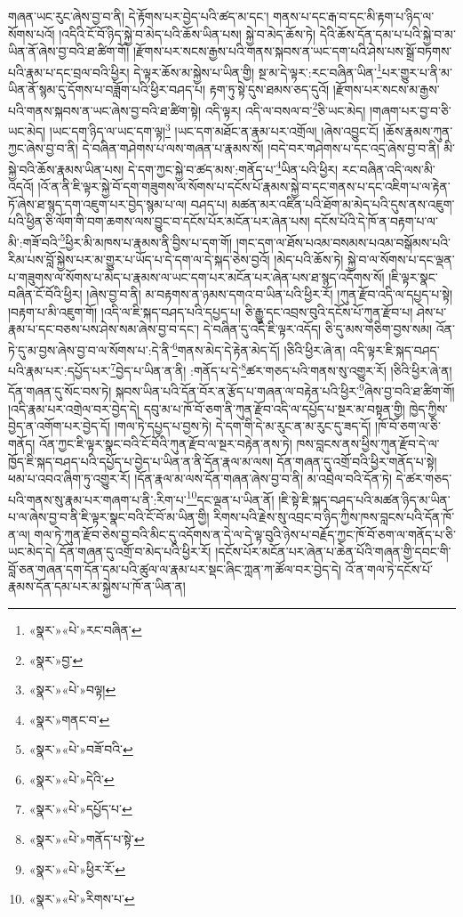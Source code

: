 གཞན་ཡང་རུང་ཞེས་བྱ་བ་ནི། དེ་རྟོགས་པར་བྱེད་པའི་ཚད་མ་དང་། གནས་པ་དང་རྒ་བ་དང་མི་རྟག་པ་ཉིད་ལ་སོགས་པའོ། །འདིའི་ངོ་བོ་ཉིད་སྐྱེ་བ་མེད་པའི་ཆོས་ཡིན་པས། སྐྱེ་བ་མེད་ཆོས་ཏེ། དེའི་ཆོས་དོན་དམ་པ་པའི་སྐྱེ་བ་མ་ཡིན་ནོ་ཞེས་བྱ་བའི་ཐ་ཚིག་གོ། །རྫོགས་པར་སངས་རྒྱས་པའི་གནས་སྐབས་ན་ཡང་དག་པའི་ཤེས་པས་སྒྲོ་བཏགས་པའི་རྣམ་པ་དང་བྲལ་བའི་ཕྱིར། དེ་ལྟར་ཆོས་མ་སྐྱེས་པ་ཡིན་གྱི། སྔ་མ་དེ་ལྟར་:རང་བཞིན་ཡིན་\footnote{«སྣར་»«པེ་»རང་བཞིན་}པར་གྱུར་པ་ནི་མ་ཡིན་ནོ་སྙམ་དུ་དོགས་པ་བཟློག་པའི་ཕྱིར་བཤད་པ། རྟག་ཏུ་སྟེ་དུས་ཐམས་ཅད་དུའོ། །རྫོགས་པར་སངས་མ་རྒྱས་པའི་གནས་སྐབས་ན་ཡང་ཞེས་བྱ་བའི་ཐ་ཚིག་སྟེ། འདི་ལྟར། འདི་ལ་བསལ་བ་\footnote{«སྣར་»བྱ་}ཅི་ཡང་མེད། །གཞག་པར་བྱ་བ་ཅི་ཡང་མེད། །ཡང་དག་ཉིད་ལ་ཡང་དག་ལྟ།\footnote{«སྣར་»«པེ་»བལྟ།} །ཡང་དག་མཐོང་ན་རྣམ་པར་འགྲོལ། །ཞེས་འབྱུང་ངོ། །ཆོས་རྣམས་ཀུན་ཀྱང་ཞེས་བྱ་བ་ནི། དེ་བཞིན་གཤེགས་པ་ལས་གཞན་པ་རྣམས་སོ། །བདེ་བར་གཤེགས་པ་དང་འདྲ་ཞེས་བྱ་བ་ནི། མི་སྐྱེ་བའི་ཆོས་རྣམས་ཡིན་པས། དེ་དག་ཀྱང་སྐྱེ་བ་ཚད་མས་:གནོད་པ་\footnote{«སྣར་»གནང་བ་}ཡིན་པའི་ཕྱིར། རང་བཞིན་འདི་ལས་མི་འདའོ། །འོ་ན་ནི་ཇི་ལྟར་སྐྱེ་བོ་དག་གཟུགས་ལ་སོགས་པ་དངོས་པོ་རྣམས་སྐྱེ་བ་དང་གནས་པ་དང་འཇིག་པ་ལ་རྟེན་ཏོ་ཞེས་ཐ་སྙད་དག་འཇུག་པར་བྱེད་སྙམ་པ་ལ། བཤད་པ། མཚན་མར་འཛིན་པའི་ཐོག་མ་མེད་པའི་དུས་ནས་འཇུག་པའི་ཕྱིན་ཅི་ལོག་གི་བག་ཆགས་ལས་བྱུང་བ་དངོས་པོར་མངོན་པར་ཞེན་པས། དངོས་པོའི་དེ་ཁོ་ན་བརྟག་པ་ལ་མི་:གཟོ་བའི་\footnote{«སྣར་»«པེ་»བཟོ་བའི་}ཕྱིར་མི་མཁས་པ་རྣམས་ནི་བྱིས་པ་དག་གོ། །གང་དག་ལ་ཐོས་པའམ་བསམས་པའམ་བསྒོམས་པའི་རིམ་པས་བློ་སྐྱེས་པར་མ་གྱུར་པ་ཡོད་པ་དེ་དག་ལ་དེ་སྐད་ཅེས་བྱའོ། །མེད་པའི་ཆོས་ཏེ། སྐྱེ་བ་ལ་སོགས་པ་དང་ལྡན་པ་གཟུགས་ལ་སོགས་པ་མེད་པ་རྣམས་ལ་ཡང་དག་པར་མངོན་པར་ཞེན་པས་ཐ་སྙད་འདོགས་སོ། །ཇི་ལྟར་སྣང་བཞིན་ངོ་བོའི་ཕྱིར། །ཞེས་བྱ་བ་ནི། མ་བརྟགས་ན་ཉམས་དགའ་བ་ཡིན་པའི་ཕྱིར་རོ། །ཀུན་རྫོབ་འདི་ལ་དཔྱད་པ་སྟེ། །བརྟག་པ་མི་འཇུག་གོ། །འདི་ལ་ཇི་སྐད་བཤད་པའི་དཔྱད་པ། ཅི་རྒྱུ་དང་འབྲས་བུའི་དངོས་པོ་ཀུན་རྫོབ་པ། ཤེས་པ་རྣམ་པ་དང་བཅས་པས་ཤེས་སམ་ཞེས་བྱ་བ་དང་། དེ་བཞིན་དུ་འདི་ཇི་ལྟར་འདོད། ཅི་དུ་མས་གཅིག་བྱས་སམ། འོན་ཏེ་དུ་མ་བྱས་ཞེས་བྱ་བ་ལ་སོགས་པ་:དེ་ནི་\footnote{«སྣར་»«པེ་»དེའི་}གནས་མེད་དེ་རྟེན་མེད་དོ། །ཅིའི་ཕྱིར་ཞེ་ན། འདི་ལྟར་ཇི་སྐད་བཤད་པའི་རྣམ་པར་:དཔྱོད་པར་\footnote{«སྣར་»«པེ་»དཔྱོད་པ་}བྱེད་པ་ཡིན་ན་ནི། :གནོད་པ་དེ་\footnote{«སྣར་»«པེ་»གནོད་པ་སྟེ་}ཚར་གཅད་པའི་གནས་སུ་འགྱུར་རོ། །ཅིའི་ཕྱིར་ཞེ་ན། དོན་གཞན་དུ་སོང་བས་ཏེ། སྐབས་ཡིན་པའི་དོན་བོར་ན་རྩོད་པ་གཞན་ལ་བརྟེན་པའི་ཕྱིར་\footnote{«སྣར་»«པེ་»ཕྱིར་རོ་}ཞེས་བྱ་བའི་ཐ་ཚིག་གོ། །འདི་རྣམ་པར་འགྲེལ་བར་བྱེད་དེ། དབུ་མ་པ་ཁོ་བོ་ཅག་ནི་ཀུན་རྫོབ་འདི་ལ་དཔྱོད་པ་སྔར་མ་བསྟན་གྱི། ཁྱེད་ཀྱིས་བྱེད་ན་འགོག་པར་བྱེད་དོ། །གལ་ཏེ་དཔྱད་པ་བྱས་ཏེ། དེ་དག་གི་དེ་མ་རུང་ན་མ་རུང་དུ་ཟད་དོ། །ཁོ་བོ་ཅག་ལ་ཅི་གནོད། འོན་ཀྱང་ཇི་ལྟར་སྣང་བའི་ངོ་བོའི་ཀུན་རྫོབ་ལ་སྔར་བརྟེན་ནས་ཏེ། ཁས་བླངས་ནས་ཕྱིས་ཀུན་རྫོབ་དེ་ལ་ཁྱོད་ཇི་སྐད་བཤད་པའི་དཔྱོད་པ་བྱེད་པ་ཡིན་ན་ནི་དོན་རྣལ་མ་ལས། དོན་གཞན་དུ་འགྲོ་བའི་ཕྱིར་གནོད་པ་སྟེ། ཕམ་པ་འབའ་ཞིག་ཏུ་འགྱུར་རོ། །དོན་རྣལ་མ་ལས་དོན་གཞན་ཞེས་བྱ་བ་ནི། མ་འབྲེལ་བའི་དོན་ཏེ། དེ་ཚར་གཅད་པའི་གནས་སུ་རྣམ་པར་གཞག་པ་ནི་:རིག་པ་\footnote{«སྣར་»«པེ་»རིགས་པ་}དང་ལྡན་པ་ཡིན་ནོ། །ཇི་སྟེ་ཇི་སྐད་བཤད་པའི་མཚན་ཉིད་མ་ཡིན་པ་ལ་ཞེས་བྱ་བ་ནི་ཇི་ལྟར་སྣང་བའི་ངོ་བོ་མ་ཡིན་གྱི། རིགས་པའི་རྗེས་སུ་འབྲང་བ་ཉིད་ཀྱིས་ཁས་བླངས་པའི་དོན་ཁོ་ན་ལ། གལ་ཏེ་ཀུན་རྫོབ་ཅེས་བྱ་བའི་མིང་དུ་འདོགས་ན་དེ་ལ་དེ་ལྟ་བུའི་ཉེས་པ་བརྗོད་ཀྱང་ཁོ་བོ་ཅག་ལ་གནོད་པ་ཅི་ཡང་མེད་དེ། དོན་གཞན་དུ་འགྲོ་བ་མེད་པའི་ཕྱིར་རོ། །དངོས་པོར་མངོན་པར་ཞེན་པ་ཆེན་པོའི་གཞན་གྱི་དབང་གི་བློ་ཅན་གཞན་དག་དོན་དམ་པའི་ཚུལ་ལ་རྣམ་པར་སྡང་ཞིང་ཀླན་ཀ་ཚོལ་བར་བྱེད་དེ། འོ་ན་གལ་ཏེ་དངོས་པོ་རྣམས་དོན་དམ་པར་མ་སྐྱེས་པ་ཁོ་ན་ཡིན་ན། 